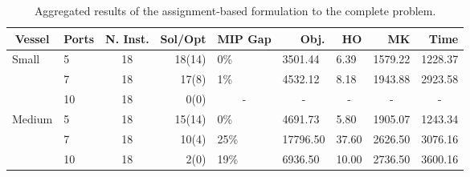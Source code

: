 \documentclass[preprint,12pt,authoryear]{elsarticle}
\begin{document}
\begin{table}[]
    \centering
    \scriptsize
    \caption{Aggregated results of the assignment-based formulation to the complete problem.}
    \label{tab:mp_full}
    \begin{tabular}{llcrlllll}
        \multicolumn{1}{c}{\textbf{Vessel}} & \multicolumn{1}{c}{\textbf{Ports}} & \textbf{N. Inst.} & \textbf{Sol/Opt} & \multicolumn{1}{r}{\textbf{MIP Gap}} & \multicolumn{1}{r}{\textbf{Obj.}} & \multicolumn{1}{r}{\textbf{HO}} & \multicolumn{1}{r}{\textbf{MK}} & \multicolumn{1}{r}{\textbf{Time}} \\ \hline
        \multirow{3}{*}{Small}              & 5                                  & 18                & 18(14)           & 0\%                                  & 3501.44                           & 6.39                            & 1579.22                         & 1228.37                           \\
                                            & 7                                  & 18                & 17(8)            & 1\%                                  & 4532.12                           & 8.18                            & 1943.88                         & 2923.58                           \\
                                            & 10                                 & 18                & 0(0)             & \multicolumn{1}{c}{-}                & \multicolumn{1}{c}{-}             & \multicolumn{1}{c}{-}           & \multicolumn{1}{c}{-}           & \multicolumn{1}{c}{-}             \\ \hline
        \multirow{3}{*}{Medium}             & 5                                  & 18                & 15(14)           & 0\%                                  & 4691.73                           & 5.80                            & 1905.07                         & 1243.34                           \\
                                            & 7                                  & 18                & 10(4)            & 25\%                                 & 17796.50                          & 37.60                           & 2626.50                         & 3076.16                           \\
                                            & 10                                 & 18                & 2(0)             & 19\%                                 & 6936.50                           & 10.00                           & 2736.50                         & 3600.16                           \\ \hline

\end{tabular}
\end{table}
\end{document}
